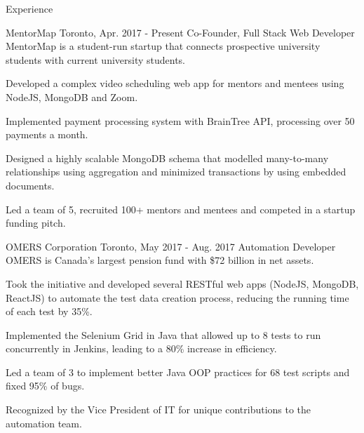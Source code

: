 \documentclass{resume} %
\begin{document}
\begin{rSection}{Experience}

\begin{expSec}
{MentorMap}
{Toronto, Apr. 2017 - Present}
{Co-Founder, Full Stack Web Developer \href{https://www.mentormap.ca/}{\space\small\faExternalLink}}
{MentorMap is a student-run startup that connects prospective university students with current university students.}
\item Developed a complex video scheduling web app for mentors and mentees using NodeJS, MongoDB and Zoom.
\item Implemented payment processing system with BrainTree API, processing over 50 payments a month.
\item Designed a highly scalable MongoDB schema that modelled many-to-many relationships using aggregation and minimized transactions by using embedded documents.
\item Led a team of 5, recruited 100+ mentors and mentees and competed in a startup funding pitch.
\end{expSec}

\begin{expSec}
{OMERS Corporation}
{Toronto, May 2017 - Aug. 2017}
{Automation Developer \href{http://www.omers.com/}{\space\small\faExternalLink}}
{OMERS is Canada's largest pension fund with \$72 billion in net assets.}
\item Took the initiative and developed several RESTful web apps \href{https://github.com/jsun98/OMERS_DataCreation}{\small\faGithub}
(NodeJS, MongoDB, ReactJS) to automate the test data creation process, reducing the running time of each test by 35\%.
\item Implemented the Selenium Grid in Java that allowed up to 8 tests to run concurrently in Jenkins, leading to a 80\% increase in efficiency.
\item Led a team of 3 to implement better Java OOP practices for 68 test scripts and fixed 95\% of bugs.
\item Recognized by the Vice President of IT for unique contributions to the automation team.
\end{expSec}



\end{rSection}


\end{document}
